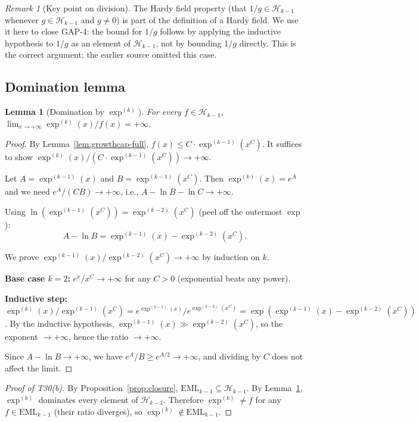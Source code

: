 \documentclass[12pt,a4paper]{article}
\newtheorem{lemma}[theorem]{Lemma}
\theoremstyle{definition}
\theoremstyle{remark}
\newtheorem{remark}[theorem]{Remark}
\begin{document}
\begin{remark}[Key point on division]
The Hardy field property (that $1/g \in \mathcal{H}_{k-1}$ whenever
$g \in \mathcal{H}_{k-1}$ and $g \neq 0$) is part of the definition of a Hardy field.
We use it here to close GAP-4: the bound for $1/g$ follows by applying the inductive
hypothesis to $1/g$ as an element of $\mathcal{H}_{k-1}$, not by bounding $1/g$
directly.  This is the correct argument; the earlier source omitted this case.
\end{remark}

\subsection{Domination lemma}

\begin{lemma}[Domination by $\exp^{(k)}$]\label{lem:dom}
For every $f \in \mathcal{H}_{k-1}$,
$\lim_{x \to +\infty} \exp^{(k)}(x) / f(x) = +\infty$.
\end{lemma}

\begin{proof}
By Lemma~\ref{lem:growthcap-full}, $f(x) \leq C \cdot \exp^{(k-1)}(x^C)$.
It suffices to show $\exp^{(k)}(x) / (C \cdot \exp^{(k-1)}(x^C)) \to +\infty$.

Let $A = \exp^{(k-1)}(x)$ and $B = \exp^{(k-1)}(x^C)$.
Then $\exp^{(k)}(x) = e^A$ and we need $e^A / (CB) \to +\infty$,
i.e., $A - \ln B - \ln C \to +\infty$.

Using $\ln(\exp^{(k-1)}(x^C)) = \exp^{(k-2)}(x^C)$ (peel off the outermost $\exp$):
\[
  A - \ln B = \exp^{(k-1)}(x) - \exp^{(k-2)}(x^C).
\]

We prove $\exp^{(k-1)}(x) / \exp^{(k-2)}(x^C) \to +\infty$ by induction on $k$.

\textbf{Base case $k = 2$:} $e^x / x^C \to +\infty$ for any $C > 0$
(exponential beats any power).

\textbf{Inductive step:}
$\exp^{(k)}(x) / \exp^{(k-1)}(x^C)
= e^{\exp^{(k-1)}(x)} / e^{\exp^{(k-2)}(x^C)}
= \exp(\exp^{(k-1)}(x) - \exp^{(k-2)}(x^C))$.
By the inductive hypothesis, $\exp^{(k-1)}(x) \gg \exp^{(k-2)}(x^C)$,
so the exponent $\to +\infty$, hence the ratio $\to +\infty$.

Since $A - \ln B \to +\infty$, we have $e^A / B \geq e^{A/2} \to +\infty$,
and dividing by $C$ does not affect the limit.
\end{proof}

\begin{proof}[Proof of T30(b)]
By Proposition~\ref{prop:closure}, $\mathrm{EML}_{k-1} \subseteq \mathcal{H}_{k-1}$.
By Lemma~\ref{lem:dom}, $\exp^{(k)}$ dominates every element of $\mathcal{H}_{k-1}$.
Therefore $\exp^{(k)} \neq f$ for any $f \in \mathrm{EML}_{k-1}$
(their ratio diverges), so $\exp^{(k)} \notin \mathrm{EML}_{k-1}$.
\end{proof}
\end{document}
